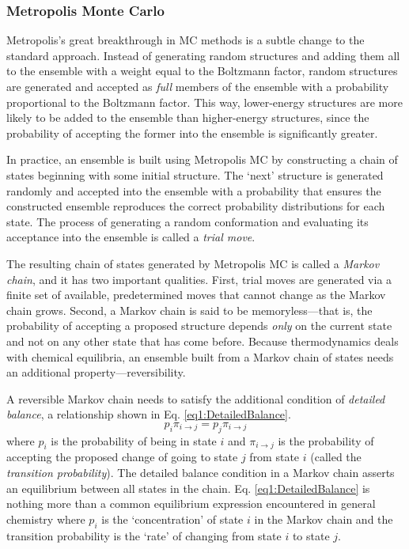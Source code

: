\subsubsection*{Metropolis Monte Carlo}

Metropolis's great breakthrough in MC methods is a subtle change to the standard
approach. Instead of generating random structures and adding them all to the
ensemble with a weight equal to the Boltzmann factor, random structures are
generated and accepted as \emph{full} members of the ensemble with a probability
proportional to the Boltzmann factor. This way, lower-energy structures are more
likely to be added to the ensemble than higher-energy structures, since the
probability of accepting the former into the ensemble is significantly greater.

In practice, an ensemble is built using Metropolis MC by constructing a chain of
states beginning with some initial structure. The `next' structure is generated
randomly and accepted into the ensemble with a probability that ensures the
constructed ensemble reproduces the correct probability distributions for each
state. The process of generating a random conformation and evaluating its
acceptance into the ensemble is called a \emph{trial move}.

The resulting chain of states generated by Metropolis MC is called a
\emph{Markov chain}, and it has two important qualities. First, trial moves are
generated via a finite set of available, predetermined moves that cannot change
as the Markov chain grows. Second, a Markov chain is said to be
memoryless---that is, the probability of accepting a proposed structure depends
\emph{only} on the current state and not on any other state that has come
before. Because thermodynamics deals with chemical equilibria, an ensemble built
from a Markov chain of states needs an additional property---reversibility.

A reversible Markov chain needs to satisfy the additional condition of
\emph{detailed balance}, a relationship shown in Eq. \ref{eq1:DetailedBalance}.
\begin{equation}
   p_i \pi_{i \rightarrow j} = p_j \pi_{i \rightarrow j}
   \label{eq1:DetailedBalance}
\end{equation}
where $p_i$ is the probability of being in state $i$ and $\pi_{i \rightarrow j}$
is the probability of accepting the proposed change of going to state $j$ from
state $i$ (called the \emph{transition probability}). The detailed balance
condition in a Markov chain asserts an equilibrium between all states in the
chain. Eq. \ref{eq1:DetailedBalance} is nothing more than a common equilibrium
expression encountered in general chemistry where $p_i$ is the `concentration'
of state $i$ in the Markov chain and the transition probability is the `rate' of
changing from state $i$ to state $j$.

